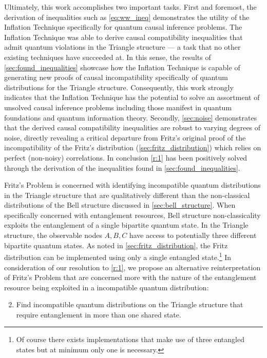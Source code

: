 \documentclass[aps, 10pt, english, twoside, pra, nofootinbib, tightenlines, longbibliography, superscriptaddress]{revtex4-1}
\begin{document}
    Ultimately, this work accomplishes two important tasks. First and foremost, the derivation of inequalities such as \cref{eq:ww_ineq} demonstrates the utility of the Inflation Technique specifically for quantum causal inference problems. The Inflation Technique was able to derive causal compatibility inequalities that admit quantum violations in the Triangle structure --- a task that no other existing techniques have succeeded at. In this sense, the results of \cref{sec:found_inequalities} showcase how the Inflation Technique is capable of generating new proofs of causal incompatibility specifically of quantum distributions for the Triangle structure. Consequently, this work strongly indicates that the Inflation Technique has the potential to solve an assortment of unsolved causal inference problems including those manifest in quantum foundations and quantum information theory. Secondly, \cref{sec:noise} demonstrates that the derived causal compatibility inequalities are robust to varying degrees of noise, directly revealing a critical departure from Fritz's original proof of the incompatibility of the Fritz's distribution (\cref{sec:fritz_distribution}) which relies on perfect (non-noisy) correlations. In conclusion \ref{r:1} has been positively solved through the derivation of the inequalities found in \cref{sec:found_inequalities}.



    Fritz's Problem is concerned with identifying incompatible quantum distributions in the Triangle structure that are qualitatively different than the non-classical distributions of the Bell structure discussed in \cref{sec:bell_structure}. When specifically concerned with entanglement resources, Bell structure non-classicality exploits the entanglement of a single bipartite quantum state. In the Triangle structure, the observable nodes $A,B,C$ have access to potentially three different bipartite quantum states. As noted in \cref{sec:fritz_distribution}, the Fritz distribution can be implemented using only a single entangled state.\footnote{Of course there exists implementations that make use of three entangled states but at minimum only one is necessary.} In consideration of our resolution to \ref{r:1}, we propose an alternative reinterpretation of Fritz's Problem that are concerned more with the nature of the entanglement resource being exploited in a incompatible quantum distribution:

    \begin{enumerate}[label=\textbf{FP.\Alph*}]
        \setcounter{enumi}{1}
        \item \label{r:2} Find incompatible quantum distributions on the Triangle structure that require entanglement in more than one shared state.
    \end{enumerate}
\end{document}
